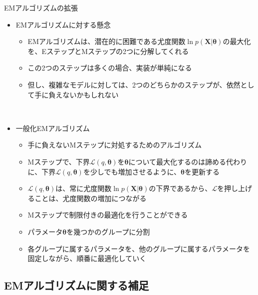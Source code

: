 \documentclass[dvipdfmx,notheorems,t]{beamer}
\begin{document}
\begin{frame}{EMアルゴリズムの拡張}

\begin{itemize}
	\item EMアルゴリズムに対する懸念
	\begin{itemize}
		\item EMアルゴリズムは、潜在的に困難である尤度関数$\ln p(\bm{X} | \bm{\theta})$の最大化を、\alert{Eステップ}と\alert{Mステップ}の2つに分解してくれる
		\item この2つのステップは多くの場合、実装が単純になる
		\newline
		\item 但し、複雑なモデルに対しては、2つのどちらかのステップが、\alert{依然として手に負えないかもしれない}
	\end{itemize} \
	
	\item 一般化EMアルゴリズム
	\begin{itemize}
		\item 手に負えないMステップに対処するためのアルゴリズム
		\item Mステップで、下界$\mathcal{L}(q, \bm{\theta})$を$\bm{\theta}$について\alert{最大化するのは諦める}代わりに、下界$\mathcal{L}(q, \bm{\theta})$を\alert{少しでも増加させるように}、$\bm{\theta}$を更新する
		\newline
		\item $\mathcal{L}(q, \bm{\theta})$は、\alert{常に}尤度関数$\ln p(\bm{X} | \bm{\theta})$の下界であるから、$\mathcal{L}$を押し上げることは、尤度関数の増加につながる
		\newline
		\item Mステップで\alert{制限付きの最適化}を行うことができる
		\item パラメータ$\bm{\theta}$を\alert{幾つかのグループに分割}
		\item 各グループに属するパラメータを、\alert{他のグループに属するパラメータを固定しながら}、\alert{順番に最適化}していく
	\end{itemize}
\end{itemize}

\end{frame}

\subsection{EMアルゴリズムに関する補足}

\begin{frame}

\end{frame}
\end{document}
